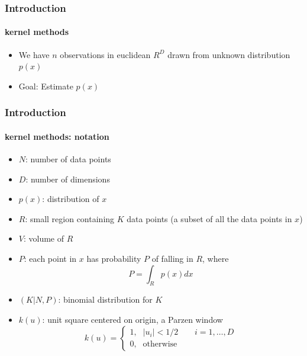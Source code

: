 \begin{frame}
\frametitle{Introduction}
\framesubtitle{kernel methods}
\logoCSIPCPL\mypagenum
	\begin{itemize}
		\item We have $n$ observations in euclidean $R^D$ drawn from unknown distribution $p(x)$
		\item {\color{red}Goal: } Estimate $p(x)$
	\end{itemize}
\end{frame}




\begin{frame}
\frametitle{Introduction}
\framesubtitle{kernel methods: notation}
\logoCSIPCPL\mypagenum
	\begin{itemize}
		\item {\color{red}$N$}: number of data points
		\item {\color{red}$D$}: number of dimensions
	 	\item {\color{red}$p(x)$}: distribution of {\color{red}$x$}
		\item {\color{red}$R$}: small region containing {\color{red}$K$} data points (a subset of all the data points in $x$)
		\item {\color{red}$V$}: volume of $R$
		\item {\color{red}$P$}: each point in $x$ has probability $P$ of falling in $R$, where
			\begin{equation*}
				P=\int_R p(x)dx
			\end{equation*}
		\item {\color{red}$(K|N,P)$}: binomial distribution for $K$
		\item {\color{red} $k(u)$}: unit square centered on origin, a Parzen window
			\begin{equation*}
				k(u) = 
				\left\{ 
				\begin{array}{rl}
					1\text{,} &  |u_i|<1/2 \ \ \ \ \ \ \ \ \ i=1,\ldots, D\\ 
					0\text{,} &  \mbox{otherwise}
				\end{array}
				\right.
			\end{equation*}
	\end{itemize}
\end{frame}


